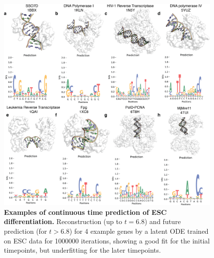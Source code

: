 \begin{center}
\begin{figure}[H]
  \includegraphics[width=\linewidth]{./pdnafigs/figS8.png}
    \caption[Examples of continuous time prediction of ESC differentiation.]{\textbf{Examples of continuous time prediction of ESC differentiation.} Reconstruction (up to $t=6.8$) and future prediction (for $t>6.8$) for 4 example genes by a  latent ODE \citep{chen2018neural} trained on ESC data \citep{Klein2015} for 1000000 iterations, showing a good fit for the initial timepoints, but underfitting for the later timepoints.}
  \label{fig:pdnaS8}
\end{figure}
\end{center}

